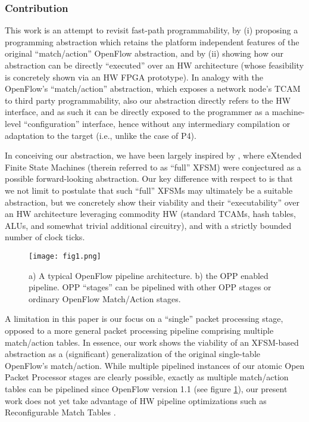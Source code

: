 \documentclass{sig-alternate}
\begin{document}
\vspace{-3pt}
\subsubsection*{Contribution}

This work is an attempt to revisit fast-path programmability, by (i) proposing a programming abstraction which retains the platform independent features of the original ``match/action'' OpenFlow abstraction, and by (ii) showing how our abstraction can be directly ``executed'' over an HW architecture (whose feasibility is concretely shown via an HW FPGA prototype). In analogy with the OpenFlow's ``match/action'' abstraction, which exposes a network node's TCAM to third party programmability, also our abstraction directly refers to the HW interface, and as such it can be directly exposed to the programmer as a machine-level ``configuration'' interface, hence without any intermediary compilation or adaptation to the target (i.e., unlike the case of P4). 

In conceiving our abstraction, we have been largely inspired by \cite{ccr14}, where eXtended Finite State Machines \cite{Che93} (therein referred to as ``full'' XFSM) were conjectured as a possible forward-looking abstraction. Our key difference with respect to \cite{ccr14} is that we not limit to postulate that such ``full'' XFSMs may ultimately be a suitable abstraction, but we concretely show their viability and their ``executability'' over an HW architecture leveraging commodity HW (standard TCAMs, hash tables, ALUs, and somewhat trivial additional circuitry), and with a strictly bounded number of clock ticks.

\begin{figure}[t]
	\texttt{[image: fig1.png]}
	  \vspace{-2em}
	\caption{a) A typical OpenFlow pipeline architecture. b) the OPP enabled pipeline. OPP ``stages'' can be pipelined with other OPP stages or ordinary OpenFlow Match/Action stages.}
	  \vspace{-1em}
	\label{f:pipe}
\end{figure}

A limitation in this paper is our focus on a ``single'' packet processing stage, opposed to a more general packet processing pipeline comprising multiple match/action tables. In essence, our work shows the viability of an XFSM-based abstraction as a (significant) generalization of the original single-table OpenFlow's match/action. While multiple pipelined instances of our atomic Open Packet Processor stages are clearly possible, exactly as multiple match/action tables can be pipelined since OpenFlow version 1.1 (see figure \ref{f:pipe}), our present work does not yet take advantage of HW pipeline optimizations such as Reconfigurable Match Tables \cite{Bos13}.
\end{document}
